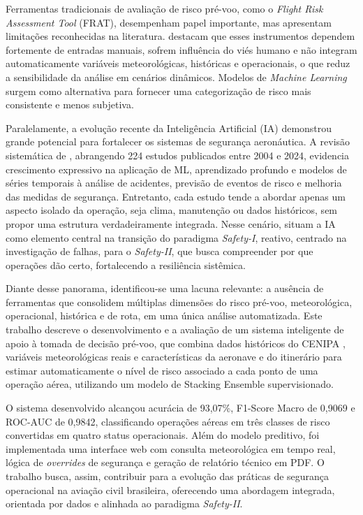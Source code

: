\documentclass[english,brazilian]{UNISINOSartigo}
\begin{document}
Ferramentas tradicionais de avaliação de risco pré-voo, como o \textit{Flight
Risk Assessment Tool} (FRAT), desempenham papel importante, mas apresentam
limitações reconhecidas na literatura.  destacam que esses
instrumentos dependem fortemente de entradas manuais, sofrem influência do viés
humano e não integram automaticamente variáveis meteorológicas, históricas e
operacionais, o que reduz a sensibilidade da análise em cenários dinâmicos.
Modelos de \textit{Machine Learning} surgem como alternativa para fornecer uma
categorização de risco mais consistente e menos subjetiva.

Paralelamente, a evolução recente da Inteligência Artificial (IA) demonstrou grande
potencial para fortalecer os sistemas de segurança aeronáutica. A revisão
sistemática de , abrangendo 224 estudos publicados entre
2004 e 2024, evidencia crescimento expressivo na aplicação de ML, aprendizado
profundo e modelos de séries temporais à análise de acidentes, previsão de eventos
de risco e melhoria das medidas de segurança. Entretanto, cada estudo tende a
abordar apenas um aspecto isolado da operação, seja clima, manutenção ou dados
históricos, sem propor uma estrutura verdadeiramente integrada. Nesse cenário,
 situam a IA como elemento central na transição do
paradigma \textit{Safety-I}, reativo, centrado na investigação de falhas, para o
\textit{Safety-II}, que busca compreender por que operações dão certo,
fortalecendo a resiliência sistêmica.

Diante desse panorama, identificou-se uma lacuna relevante: a ausência de
ferramentas que consolidem múltiplas dimensões do risco pré-voo, meteorológica,
operacional, histórica e de rota, em uma única análise automatizada. Este trabalho
descreve o desenvolvimento e a avaliação de um sistema inteligente de apoio à
tomada de decisão pré-voo, que combina dados históricos do CENIPA
\cite{CENIPA2025}, variáveis meteorológicas reais e características da aeronave e
do itinerário para estimar automaticamente o nível de risco associado a cada ponto
de uma operação aérea, utilizando um modelo de Stacking Ensemble supervisionado.

O sistema desenvolvido alcançou acurácia de 93,07\%, F1-Score Macro de 0,9069
e ROC-AUC de 0,9842, classificando operações aéreas em três classes de risco
convertidas em quatro status operacionais. Além do modelo preditivo, foi implementada uma interface web com
consulta meteorológica em tempo real, lógica de \textit{overrides} de segurança e
geração de relatório técnico em PDF. O trabalho busca, assim, contribuir para a
evolução das práticas de segurança operacional na aviação civil brasileira, oferecendo
uma abordagem integrada, orientada por dados e alinhada ao paradigma
\textit{Safety-II}.
\end{document}
